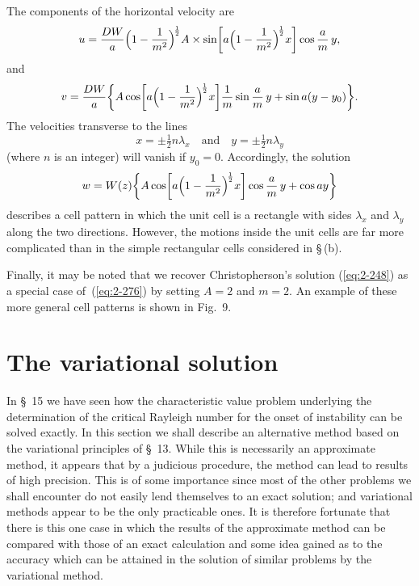 
The components of the horizontal velocity are
\begin{equation}
\label{eq:2-273}
u = \frac{DW}{a}\Bigl(1-\frac{1}{m^2}\Bigr)^{\!\frac{1}{2}} A \times
\sin\biggl[a\Bigl(1-\frac{1}{m^2}\Bigr)^{\!\frac{1}{2}}x\biggr]\cos\frac{a}{m}\,y,
\end{equation}
and
\begin{equation}
\label{eq:2-274}
v = \frac{DW}{a}\biggl\{A\cos\biggl[a\Bigl(1-\frac{1}{m^2}\Bigr)^{\!\frac{1}{2}}x\biggr]\frac{1}{m}\sin\frac{a}{m}\,y +
\sin a(y-y_0)\biggr\}.
\end{equation}
The velocities transverse to the lines
\begin{equation}
\label{eq:2-275}
x = \pm\tfrac{1}{2}n\lambda_x \quad\text{and}\quad y = \pm\tfrac{1}{2}n\lambda_y
\end{equation}
(where $n$ is an integer) will vanish if $y_0 = 0$.
Accordingly, the solution
\begin{equation}
\label{eq:2-276}
w = W(z)\biggl\{A\cos\biggl[a\Bigl(1-\frac{1}{m^2}\Bigr)^{\!\frac{1}{2}}x\biggr]\cos\frac{a}{m}\,y + \cos ay\biggr\}
\end{equation}
describes a cell pattern in which the unit cell is a rectangle with sides
$\lambda_x$ and $\lambda_y$ along the two directions. However, the motions inside the unit
cells are far more complicated than in the simple rectangular cells
considered in \S\,(b).

Finally, it may be noted that we recover Christopherson's solution
(\ref{eq:2-248}) as a special case of~(\ref{eq:2-276}) by setting $A = 2$ and $m = 2$. An example
of these more general cell patterns is shown in Fig.~9.

\section{The variational solution}\label{sec:17}

In \S~15 we have seen how the characteristic value problem underlying
the determination of the critical Rayleigh number for the onset of
instability can be solved exactly. In this section we shall describe an
alternative method based on the variational principles of \S~13. While this
is necessarily an approximate method, it appears that by a judicious
procedure, the method can lead to results of high precision. This is of
some importance since most of the other problems we shall encounter
do not easily lend themselves to an exact solution; and variational
methods appear to be the only practicable ones. It is therefore fortunate
that there is this one case in which the results of the approximate
method can be compared with those of an exact calculation and some
idea gained as to the accuracy which can be attained in the solution of
similar problems by the variational method.

